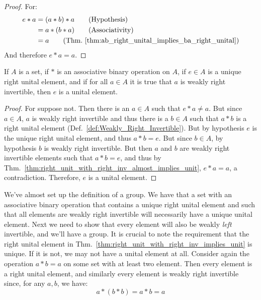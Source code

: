     \begin{proof}
        For:
        \begin{align}
            e*a&=(a*b)*a
            \tag{Hypothesis}\\
            &=a*(b*a)
            \tag{Associativity}\\
            &=a
            \tag{Thm.~\ref{thm:ab_right_unital_implies_ba_right_unital}}
        \end{align}
        And therefore $e*a=a$.
    \end{proof}
    \begin{theorem}
        \label{thm:right_unit_with_right_inv_implies_unit}%
        If $A$ is a set, if $*$ is an associative binary operation on $A$, if
        $e\in{A}$ is a unique right unital element, and if for all $a\in{A}$ it
        is true that $a$ is weakly right invertible, then $e$ is a unital
        element.
    \end{theorem}
    \begin{proof}
        For suppose not. Then there is an $a\in{A}$ such that $e*a\ne{a}$. But
        since $a\in{A}$, $a$ is weakly right invertible and thus there is a
        $b\in{A}$ such that $a*b$ is a right unital element
        (Def.~\ref{def:Weakly_Right_Invertible}). But by hypothesis $e$ is the
        unique right unital element, and thus $a*b=e$. But since $b\in{A}$,
        by hypothesis $b$ is weakly right invertible. But then $a$ and $b$ are
        weakly right invertible elements such that $a*b=e$, and thus by
        Thm.~\ref{thm:right_unit_with_right_inv_almost_implies_unit}, $e*a=a$,
        a contradiction. Therefore, $e$ is a unital element.
    \end{proof}
    We've almost set up the definition of a group. We have that a set with an
    associative binary operation that contains a unique right unital element
    and such that all elements are weakly right invertible will necessarily have
    a unique unital element. Next we need to show that every element will also
    be weakly \textit{left} invertible, and we'll have a group. It is crucial to
    note the requirement that the right unital element in
    Thm.~\ref{thm:right_unit_with_right_inv_implies_unit} is unique. If it is
    not, we may not have a unital element at all. Consider again the operation
    $a*b=a$ on some set with at least two element. Then every element is a
    right unital element, and similarly every element is weakly right invertible
    since, for any $a,b$, we have:
    \begin{equation}
        a*(b*b)=a*b=a
    \end{equation}
